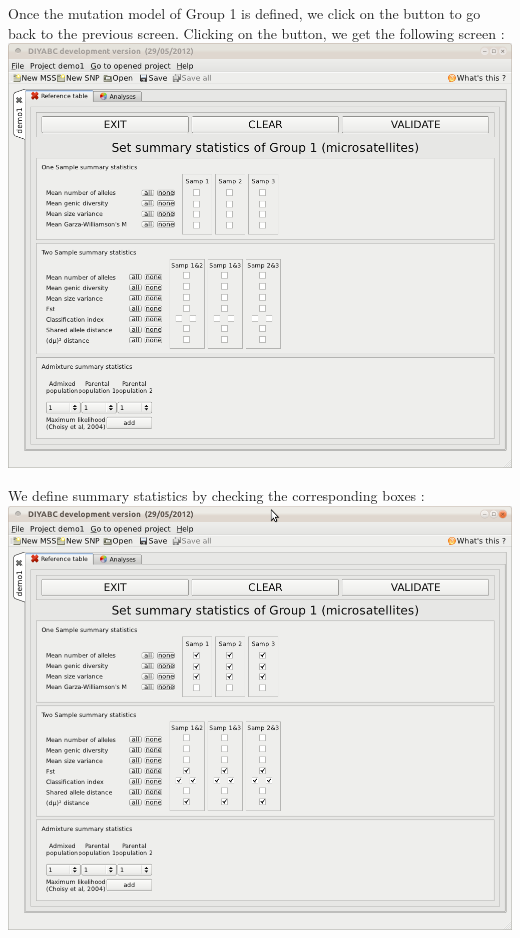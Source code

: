 Once the mutation model of Group 1 is defined, we click on the 
button to go back to the previous screen. Clicking on the  button, we get the following screen :\\


\includegraphics[scale=0.35]{gui_pictures/Capture-DIYABC-20}

We define summary statistics by checking the corresponding boxes :\\


\includegraphics[scale=0.35]{gui_pictures/Capture-DIYABC-21}


